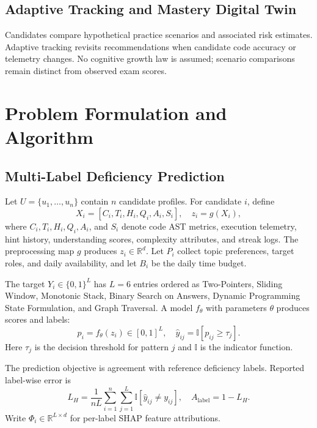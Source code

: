 \documentclass[conference]{IEEEtran}
\begin{document}
\subsection{Adaptive Tracking and Mastery Digital Twin}
Candidates compare hypothetical practice scenarios and associated risk estimates. Adaptive tracking revisits recommendations when candidate code accuracy or telemetry changes. No cognitive growth law is assumed; scenario comparisons remain distinct from observed exam scores.

\section{Problem Formulation and Algorithm}

\subsection{Multi-Label Deficiency Prediction}
Let $U = \{u_1, \dots, u_n\}$ contain $n$ candidate profiles. For candidate $i$, define
\begin{equation}
X_i = [C_i, T_i, H_i, Q_i, A_i, S_i], \quad z_i = g(X_i),
\end{equation}
where $C_i, T_i, H_i, Q_i, A_i$, and $S_i$ denote code AST metrics, execution telemetry, hint history, understanding scores, complexity attributes, and streak logs. The preprocessing map $g$ produces $z_i \in \mathbb{R}^d$. Let $P_i$ collect topic preferences, target roles, and daily availability, and let $B_i$ be the daily time budget.

The target $Y_i \in \{0, 1\}^L$ has $L = 6$ entries ordered as Two-Pointers, Sliding Window, Monotonic Stack, Binary Search on Answers, Dynamic Programming State Formulation, and Graph Traversal. A model $f_\theta$ with parameters $\theta$ produces scores and labels:
\begin{equation}
p_i = f_\theta(z_i) \in [0, 1]^L, \quad \hat{y}_{ij} = \mathbb{I}[p_{ij} \ge \tau_j].
\end{equation}
Here $\tau_j$ is the decision threshold for pattern $j$ and $\mathbb{I}$ is the indicator function.

The prediction objective is agreement with reference deficiency labels. Reported label-wise error is
\begin{equation}
L_H = \frac{1}{nL} \sum_{i=1}^n \sum_{j=1}^L \mathbb{I}[\hat{y}_{ij} \neq y_{ij}], \quad A_{\text{label}} = 1 - L_H.
\end{equation}
Write $\Phi_i \in \mathbb{R}^{L \times d}$ for per-label SHAP feature attributions.
\end{document}

